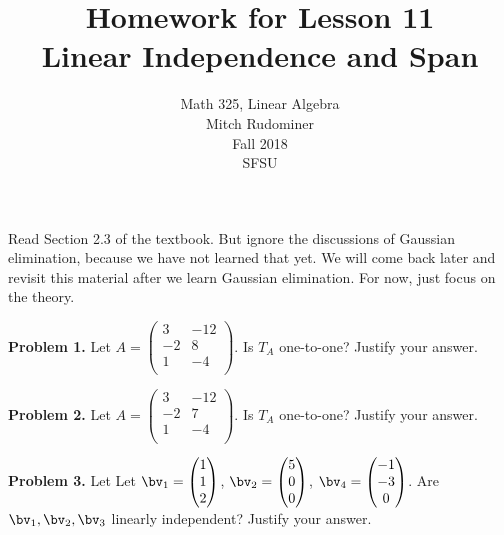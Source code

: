 \documentclass[oneside,12pt]{amsart}
\begin{document}
\title{Homework for Lesson 11 \\ Linear Independence and Span}
\author{Math 325, Linear Algebra \\ Mitch Rudominer \\ Fall 2018 \\ SFSU }
\date{}

\maketitle

Read Section 2.3 of the textbook. But ignore the discussions of
Gaussian elimination, because we have not learned that yet. We will come
back later and revisit this material after we learn Gaussian elimination.
For now, just focus on the theory.

\bigskip


\textbf{Problem 1.} Let
$
A =
\begin{pmatrix}
3  & -12 \\
-2 &  8  \\
1  & -4  \\
\end{pmatrix}
$.
Is $T_A$ one-to-one? Justify your answer.

\bigskip
\bigskip
\bigskip
\bigskip
\bigskip
\bigskip
\bigskip
\bigskip
\bigskip
\bigskip

\textbf{Problem 2.} Let
$
A =
\begin{pmatrix}
3  & -12 \\
-2 &  7  \\
1  & -4  \\
\end{pmatrix}
$.
Is $T_A$ one-to-one? Justify your answer.

\bigskip
\bigskip
\bigskip
\bigskip
\bigskip
\bigskip
\bigskip
\bigskip
\bigskip
\bigskip

\textbf{Problem 3.} Let
Let $\bv_1 =
\begin{pmatrix}
1 \\
1 \\
2 \\
\end{pmatrix}
$,
$\bv_2 =
\begin{pmatrix}
5 \\
0 \\
0 \\
\end{pmatrix}
$,
$\bv_4 =
\begin{pmatrix}
-1 \\
-3 \\
0 \\
\end{pmatrix}
$.
Are $\bv_1,\bv_2,\bv_3$ linearly independent? Justify your answer.
\end{document}

